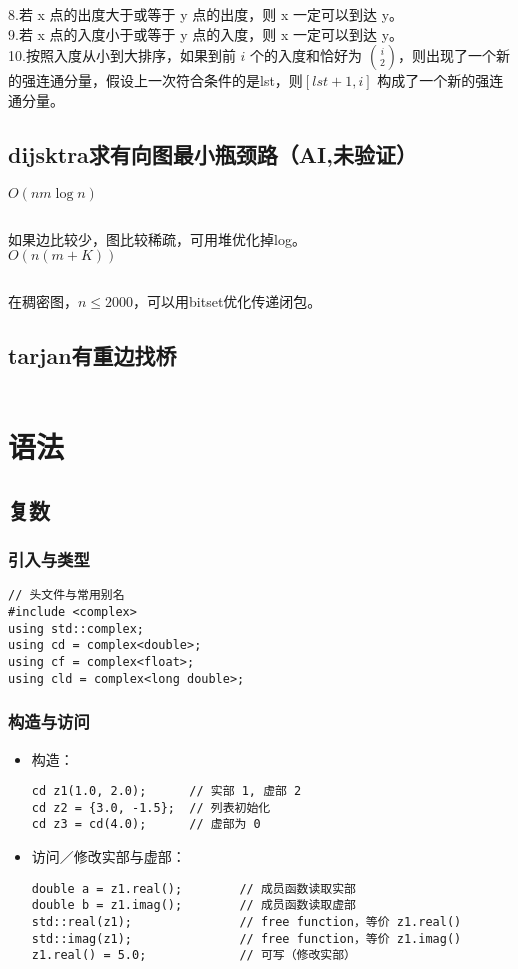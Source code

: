 \documentclass[titlepage, a4paper]{report}
\newcommand{\cppcode}[1]{  
    \inputminted[mathescape]{cpp}{source/#1}  
}
\begin{document}
8.若 x 点的出度大于或等于 y 点的出度，则 x 一定可以到达 y。\\

9.若 x 点的入度小于或等于 y 点的入度，则 x 一定可以到达 y。\\

10.按照入度从小到大排序，如果到前 $i$ 个的入度和恰好为 $\binom{i}{2}$，则出现了一个新的强连通分量，假设上一次符合条件的是lst，则$[lst+1,i]$ 构成了一个新的强连通分量。\\

\section{dijsktra求有向图最小瓶颈路（AI,未验证）}
$O(nm\log n)$
\cppcode{mindij.cpp}
如果边比较少，图比较稀疏，可用堆优化掉log。\\
$O(n(m+K))$
\cppcode{heapminmaxdij.cpp}
在稠密图，$n\le 2000$，可以用bitset优化传递闭包。

\section{tarjan有重边找桥}
\cppcode{tarjan有重边找桥.cpp}


\chapter{语法}
\section{复数}

\subsection*{引入与类型}
\begin{verbatim}
// 头文件与常用别名
#include <complex>
using std::complex;
using cd = complex<double>;
using cf = complex<float>;
using cld = complex<long double>;
\end{verbatim}

\subsection*{构造与访问}
\begin{itemize}
  \item 构造：
\begin{verbatim}
cd z1(1.0, 2.0);      // 实部 1, 虚部 2
cd z2 = {3.0, -1.5};  // 列表初始化
cd z3 = cd(4.0);      // 虚部为 0
\end{verbatim}
  \item 访问／修改实部与虚部：
\begin{verbatim}
double a = z1.real();        // 成员函数读取实部
double b = z1.imag();        // 成员函数读取虚部
std::real(z1);               // free function，等价 z1.real()
std::imag(z1);               // free function，等价 z1.imag()
z1.real() = 5.0;             // 可写（修改实部）
\end{verbatim}
\end{itemize}
\end{document}
